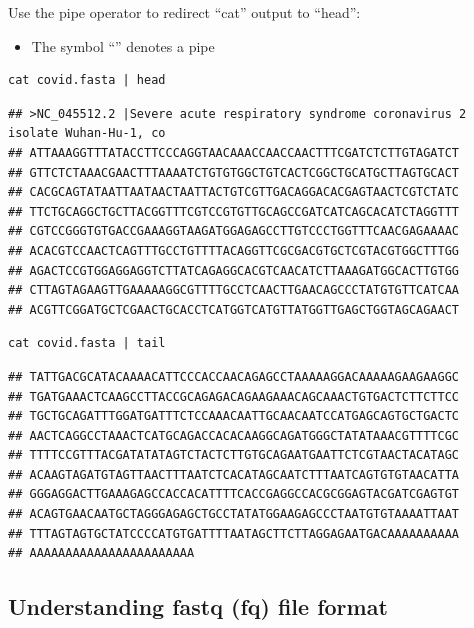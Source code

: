 \documentclass[
]{book}
\providecommand{\tightlist}{%
  \setlength{\itemsep}{0pt}\setlength{\parskip}{0pt}}
\begin{document}
Use the pipe operator to redirect ``cat'' output to ``head'':

\begin{itemize}
\tightlist
\item
  The symbol ``\textbar{}'' denotes a pipe
\end{itemize}

\begin{verbatim}
cat covid.fasta | head
\end{verbatim}

\begin{verbatim}
## >NC_045512.2 |Severe acute respiratory syndrome coronavirus 2 isolate Wuhan-Hu-1, co
## ATTAAAGGTTTATACCTTCCCAGGTAACAAACCAACCAACTTTCGATCTCTTGTAGATCT
## GTTCTCTAAACGAACTTTAAAATCTGTGTGGCTGTCACTCGGCTGCATGCTTAGTGCACT
## CACGCAGTATAATTAATAACTAATTACTGTCGTTGACAGGACACGAGTAACTCGTCTATC
## TTCTGCAGGCTGCTTACGGTTTCGTCCGTGTTGCAGCCGATCATCAGCACATCTAGGTTT
## CGTCCGGGTGTGACCGAAAGGTAAGATGGAGAGCCTTGTCCCTGGTTTCAACGAGAAAAC
## ACACGTCCAACTCAGTTTGCCTGTTTTACAGGTTCGCGACGTGCTCGTACGTGGCTTTGG
## AGACTCCGTGGAGGAGGTCTTATCAGAGGCACGTCAACATCTTAAAGATGGCACTTGTGG
## CTTAGTAGAAGTTGAAAAAGGCGTTTTGCCTCAACTTGAACAGCCCTATGTGTTCATCAA
## ACGTTCGGATGCTCGAACTGCACCTCATGGTCATGTTATGGTTGAGCTGGTAGCAGAACT
\end{verbatim}

\begin{verbatim}
cat covid.fasta | tail
\end{verbatim}

\begin{verbatim}
## TATTGACGCATACAAAACATTCCCACCAACAGAGCCTAAAAAGGACAAAAAGAAGAAGGC
## TGATGAAACTCAAGCCTTACCGCAGAGACAGAAGAAACAGCAAACTGTGACTCTTCTTCC
## TGCTGCAGATTTGGATGATTTCTCCAAACAATTGCAACAATCCATGAGCAGTGCTGACTC
## AACTCAGGCCTAAACTCATGCAGACCACACAAGGCAGATGGGCTATATAAACGTTTTCGC
## TTTTCCGTTTACGATATATAGTCTACTCTTGTGCAGAATGAATTCTCGTAACTACATAGC
## ACAAGTAGATGTAGTTAACTTTAATCTCACATAGCAATCTTTAATCAGTGTGTAACATTA
## GGGAGGACTTGAAAGAGCCACCACATTTTCACCGAGGCCACGCGGAGTACGATCGAGTGT
## ACAGTGAACAATGCTAGGGAGAGCTGCCTATATGGAAGAGCCCTAATGTGTAAAATTAAT
## TTTAGTAGTGCTATCCCCATGTGATTTTAATAGCTTCTTAGGAGAATGACAAAAAAAAAA
## AAAAAAAAAAAAAAAAAAAAAAA
\end{verbatim}

\hypertarget{understanding-fastq-fq-file-format}{%
\subsection{Understanding fastq (fq) file format}\label{understanding-fastq-fq-file-format}}
\end{document}

